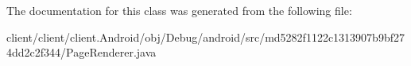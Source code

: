 The documentation for this class was generated from the following file\+:\begin{DoxyCompactItemize}
\item 
client/client/client.\+Android/obj/\+Debug/android/src/md5282f1122c1313907b9bf274dd2c2f344/Page\+Renderer.\+java\end{DoxyCompactItemize}
